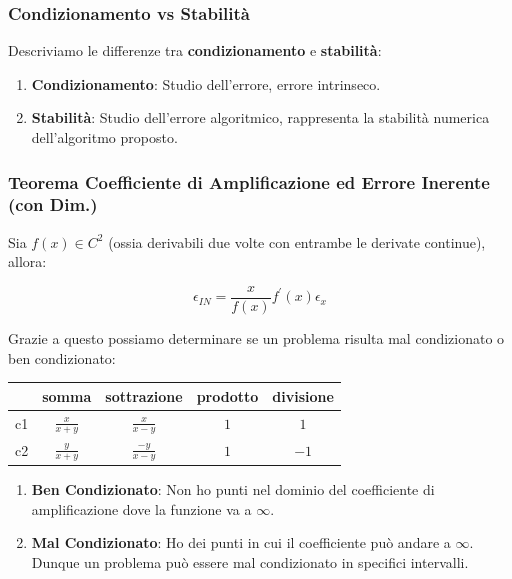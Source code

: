 \documentclass{article}
\begin{document}
\newpage

\subsubsection{Condizionamento vs Stabilità}

Descriviamo le differenze tra \textbf{condizionamento} e \textbf{stabilità}:

\begin{enumerate}
    \item \textbf{Condizionamento}: Studio dell'errore, errore intrinseco.
    \item \textbf{Stabilità}: Studio dell'errore algoritmico, rappresenta la stabilità
    \newline
    numerica dell'algoritmo proposto.
\end{enumerate}

\subsubsection{Teorema Coefficiente di Amplificazione ed Errore Inerente (con Dim.)}

Sia $f(x) \in C^{2}$ (ossia derivabili due volte con entrambe le derivate continue), allora:

\[ \boxed{\epsilon_{IN} = \frac{x}{f(x)}f^{'}(x)\epsilon_{x}} \]

Grazie a questo possiamo determinare se un problema risulta mal condizionato o ben condizionato:

\begin{center}
    \begin{tabular}{ c | c | c | c | c }
    & somma & sottrazione & prodotto & divisione \\
    \hline
    c1 & $\frac{x}{x+y}$ & $\frac{x}{x-y}$ & $1$ & $1$ \\
    \hline
    c2 & $\frac{y}{x+y}$ & $\frac{-y}{x-y}$ & $1$ & $-1$ \\
    \hline
    \end{tabular}
\end{center}

\vspace*{5px}

\begin{enumerate}
    \item \textbf{Ben Condizionato}: Non ho punti nel dominio del coefficiente di amplificazione dove la funzione va a $\infty$.
    \item \textbf{Mal Condizionato}: Ho dei punti in cui il coefficiente può andare a $\infty$. Dunque un problema può essere mal condizionato in specifici intervalli.
\end{enumerate}
\end{document}
